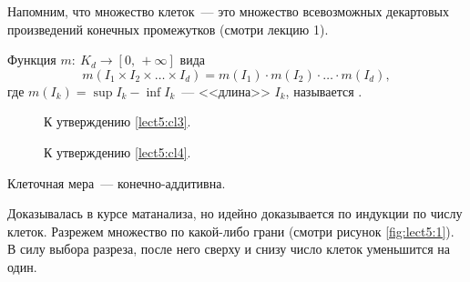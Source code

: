Напомним, что множество клеток~--- это множество всевозможных декартовых произведений конечных промежутков (смотри лекцию 1).

\begin{definition}
    Функция $m:\ K_d\rightarrow[0,\,+\infty]$ вида
    \[
        m(I_1\times I_2\times\ldots\times I_d) = m(I_1)\cdot m(I_2)\cdot\ldots\cdot m(I_d),
    \]
    где $m(I_k)=\sup I_k-\inf I_k$~--- <<длина>> $I_k$, называется .
\end{definition}

\begin{figure}
    \centering
    \begin{minipage}{.4\textwidth}
        \centering
        
        \caption{К утверждению \ref{lect5:cl3}.}
        \label{fig:lect5:1}
    \end{minipage}%
    \begin{minipage}{.6\textwidth}
        \centering
        
        \caption{К утверждению \ref{lect5:cl4}.}
        \label{fig:lect5:2}
    \end{minipage}
\end{figure}

\begin{claim}
    \label{lect5:cl3}
    Клеточная мера~--- конечно-аддитивна.

    \begin{remark}
        Доказывалась в курсе матанализа, но идейно доказывается по индукции по числу клеток.
        Разрежем множество по какой-либо грани (смотри рисунок \ref{fig:lect5:1}). В силу выбора разреза, после него сверху и снизу число клеток
        уменьшится на один.
    \end{remark}
\end{claim}

